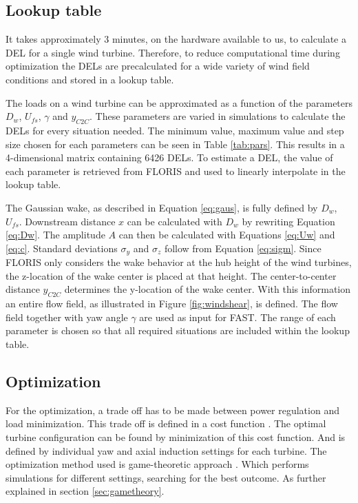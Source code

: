 \subsection{Lookup table} \label{sec:lut}
It takes approximately 3 minutes, on the hardware available to us, to calculate a DEL for a single wind turbine. Therefore, to reduce computational time during optimization the DELs are precalculated for a wide variety of wind field conditions and stored in a lookup table.

The loads on a wind turbine can be approximated as a function of the parameters $D_w$, $U_{fs}$, $\gamma$ and $y_{C2C}$. These parameters are varied in simulations to calculate the DELs for every situation needed. The minimum value, maximum value and step size chosen for each parameters can be seen in Table \ref{tab:pars}. This results in a 4-dimensional matrix containing 6426 DELs. To estimate a DEL, the value of each parameter is retrieved from FLORIS and used to linearly interpolate in the lookup table.

The Gaussian wake, as described in Equation \ref{eq:gaus}, is fully defined by $D_w$, $U_{fs}$. Downstream distance $x$ can be calculated with $D_w$ by rewriting Equation \ref{eq:Dw}. The amplitude $A$ can then be calculated with Equations \ref{eq:Uw} and \ref{eq:c}. Standard deviations $\sigma_y$ and $\sigma_z$ follow from Equation \ref{eq:sigm}. Since FLORIS only considers the wake behavior at the hub height of the wind turbines, the z-location of the wake center is placed at that height. The center-to-center distance $y_{C2C}$ determines the y-location of the wake center. With this information an entire flow field, as illustrated in Figure \ref{fig:windshear}, is defined. The flow field together with yaw angle $\gamma$ are used as input for FAST. The range of each parameter is chosen so that all required situations are included within the lookup table.

\subsection{Optimization} \label{sec:optimization}
For the optimization, a trade off has to be made between power regulation and load minimization. This trade off is defined in a cost function \cite{Marden2013, Dijk2016}. The optimal turbine configuration can be found by minimization of this cost function. And is defined by individual yaw and axial induction settings for each turbine. The optimization method used is game-theoretic approach \cite{Marden2013}. Which performs simulations for different settings, searching for the best outcome. As further explained in section \ref{sec:gametheory}. 
 

